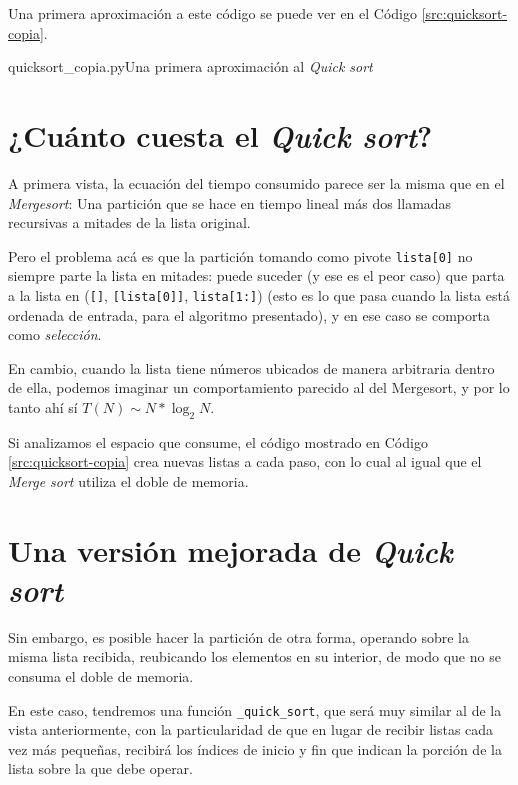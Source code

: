 Una primera aproximación a este código se puede ver en el Código
\ref{src:quicksort-copia}.

\begin{codigo}{quicksort\_copia.py}{Una primera aproximación al {\it Quick sort}}
\label{src:quicksort-copia}

\end{codigo}

\section{¿Cuánto cuesta el {\it Quick sort}?}

A primera vista, la ecuación del tiempo consumido parece ser la misma que
en el {\it Mergesort}: Una partición que se hace en tiempo lineal más dos
llamadas recursivas a mitades de la lista original.

Pero el problema acá es que la partición tomando como pivote
\lstinline!lista[0]! no siempre parte la lista en mitades: puede suceder (y
ese es el peor caso) que parta a la lista en (\lstinline![]!,
\lstinline![lista[0]]!, \lstinline!lista[1:]!) (esto es lo que pasa cuando
la lista está ordenada de entrada, para el algoritmo presentado), y en ese
caso se comporta como {\it selección}.

En cambio, cuando la lista tiene números ubicados de manera arbitraria
dentro de ella, podemos imaginar un comportamiento parecido al del
Mergesort, y por lo tanto ahí sí $T(N) \sim N * \log_2 N$.

Si analizamos el espacio que consume, el código mostrado en Código
\ref{src:quicksort-copia} crea nuevas listas a cada paso, con lo cual al
igual que el {\it Merge sort} utiliza el doble de memoria.

\section{Una versión mejorada de {\it Quick sort}}

Sin embargo, es posible hacer la partición de otra forma, operando sobre la
misma lista recibida, reubicando los elementos en su interior, de modo que
no se consuma el doble de memoria.

En este caso, tendremos una función \lstinline!_quick_sort!, que será muy
similar al de la vista anteriormente, con la particularidad de que en lugar
de recibir listas cada vez más pequeñas, recibirá los índices de inicio y
fin que indican la porción de la lista sobre la que debe operar.

